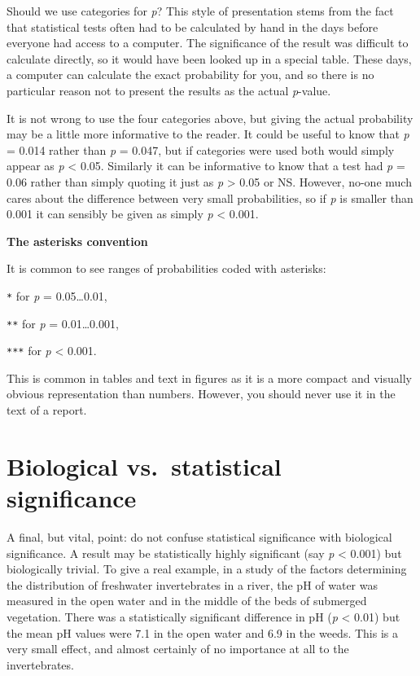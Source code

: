\documentclass[]{book}
\begin{document}
Should we use categories for \emph{p}? This style of presentation stems
from the fact that statistical tests often had to be calculated by hand
in the days before everyone had access to a computer. The significance
of the result was difficult to calculate directly, so it would have been
looked up in a special table. These days, a computer can calculate the
exact probability for you, and so there is no particular reason not to
present the results as the actual \emph{p}-value.

It is not wrong to use the four categories above, but giving the actual
probability may be a little more informative to the reader. It could be
useful to know that \emph{p} = 0.014 rather than \emph{p} = 0.047, but
if categories were used both would simply appear as \emph{p} \textless{}
0.05. Similarly it can be informative to know that a test had \emph{p} =
0.06 rather than simply quoting it just as \emph{p} \textgreater{} 0.05
or NS. However, no-one much cares about the difference between very
small probabilities, so if \emph{p} is smaller than 0.001 it can
sensibly be given as simply \emph{p} \textless{} 0.001.

\begin{advanced-box}
\textbf{The asterisks convention}

It is common to see ranges of probabilities coded with asterisks:

\texttt{*} for \emph{p} = 0.05\ldots{}0.01,

\texttt{**} for \emph{p} = 0.01\ldots{}0.001,

\texttt{***} for \emph{p} \textless{} 0.001.

This is common in tables and text in figures as it is a more compact and
visually obvious representation than numbers. However, you should never
use it in the text of a report.
\end{advanced-box}

\section{Biological vs.~statistical
significance}\label{biological-vs.statistical-significance}

A final, but vital, point: do not confuse statistical significance with
biological significance. A result may be statistically highly
significant (say \emph{p} \textless{} 0.001) but biologically trivial.
To give a real example, in a study of the factors determining the
distribution of freshwater invertebrates in a river, the pH of water was
measured in the open water and in the middle of the beds of submerged
vegetation. There was a statistically significant difference in pH
(\emph{p} \textless{} 0.01) but the mean pH values were 7.1 in the open
water and 6.9 in the weeds. This is a very small effect, and almost
certainly of no importance at all to the invertebrates.
\end{document}
